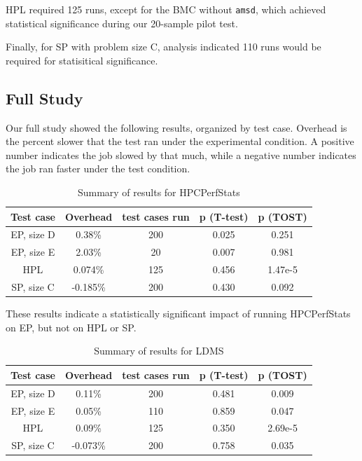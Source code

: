 \documentclass[conference]{IEEEtran}
\begin{document}
HPL required 125 runs, except for the BMC without \texttt{amsd}, which achieved 
statistical significance during our 20-sample pilot test.

Finally, for SP with problem size C, analysis indicated 110 runs would be 
required for statisitical significance.

\subsection{Full Study}

Our full study showed the following results, organized by test case. Overhead is
the percent slower that the test ran under the experimental condition. A positive 
number indicates the job slowed by that much, while a negative number indicates 
the job ran faster under the test condition.

\begin{table}[h!]
\centering
\begin{tabular}{| c | c | c | c | c |} 
    \hline
    Test case & Overhead & test cases run & p (T-test) & p (TOST) \\ 
    \hline
    EP, size D & 0.38\% & 200 & 0.025 & 0.251 \\ 
    \hline
    EP, size E & 2.03\% & 20 & 0.007 & 0.981 \\ 
    \hline
    HPL & 0.074\% & 125 & 0.456 & 1.47e-5 \\
    \hline
    SP, size C & -0.185\% & 200 & 0.430 & 0.092 \\
    \hline
\end{tabular}
\caption{Summary of results for HPCPerfStats}
\label{table:results_HPCPerfStats}
\end{table}

These results indicate a statistically significant impact of running 
HPCPerfStats on EP, but not on HPL or SP.

\begin{table}[h!]
\centering
\begin{tabular}{| c | c | c | c | c |} 
    \hline
    Test case & Overhead & test cases run & p (T-test) & p (TOST) \\ 
    \hline
    EP, size D & 0.11\% & 200 & 0.481 & 0.009 \\ 
    \hline
    EP, size E & 0.05\% & 110 & 0.859 & 0.047 \\ 
    \hline
    HPL & 0.09\% & 125 & 0.350 & 2.69e-5 \\
    \hline
    SP, size C & -0.073\% & 200 & 0.758 & 0.035 \\
    \hline
\end{tabular}
\caption{Summary of results for LDMS}
\label{table:results_LDMS}
\end{table}
\end{document}
